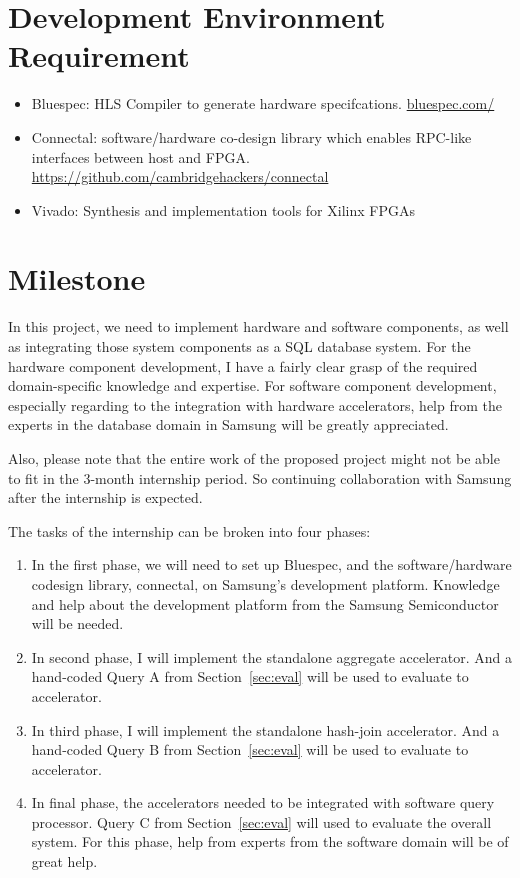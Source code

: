 \documentclass{article}
\begin{document}
\section{Development Environment Requirement}
\begin{itemize}
\item Bluespec: HLS Compiler to generate hardware specifcations. \url{bluespec.com/}
\item Connectal: software/hardware co-design library which enables RPC-like
  interfaces between host and
  FPGA. \url{https://github.com/cambridgehackers/connectal}
\item Vivado: Synthesis and implementation tools for Xilinx FPGAs
\end{itemize}

\section{Milestone}
In this project, we need to implement hardware and software components, as well as integrating those system components as a SQL database system.
For the hardware component development, I have a fairly clear grasp of the required domain-specific knowledge and expertise.
For software component development, especially regarding to the integration with hardware accelerators, help from the experts in the database domain in Samsung will be greatly appreciated.

Also, please note that the entire work of the proposed project might not be able to fit in the 3-month internship period.
So continuing collaboration with Samsung after the internship is expected.

The tasks of the internship can be broken into four phases:

\begin{enumerate}
\item In the first phase, we will need to set up Bluespec, and the software/hardware codesign library, connectal, on Samsung's development
  platform.
  Knowledge and help about the development platform from the Samsung Semiconductor will be needed.
\item In second phase, I will implement the standalone aggregate accelerator.
  And a hand-coded Query A from Section~\ref{sec:eval} will be used to evaluate to accelerator.
\item In third phase, I will implement the standalone hash-join accelerator.
  And a hand-coded Query B from Section~\ref{sec:eval} will be used to evaluate to accelerator.
\item In final phase, the accelerators needed to be integrated with software query processor.
  Query C from Section~\ref{sec:eval} will used to evaluate the overall system.
  For this phase, help from experts from the software domain will be of great help.
\end{enumerate}
\end{document}
